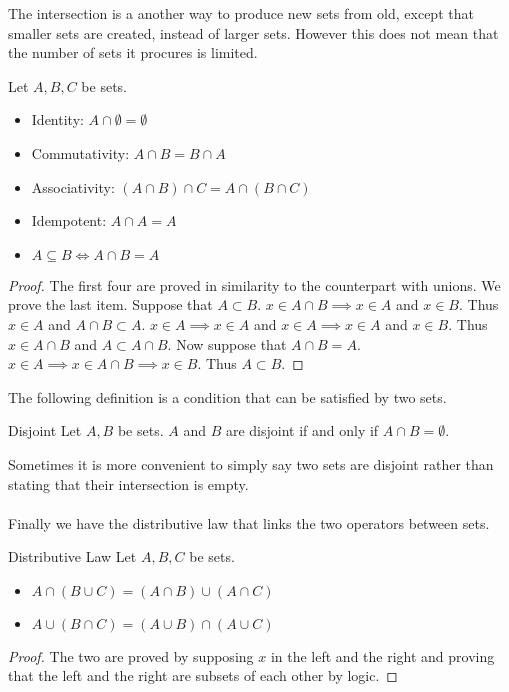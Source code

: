 The intersection is a another way to produce new sets from old, except that smaller sets are created, instead of larger sets. However this does not mean that the number of sets it procures is limited. 

\begin{prp}{}{} Let $A,B,C$ be sets. 
\begin{itemize}
\item Identity: $A\cap\emptyset=\emptyset$
\item Commutativity: $A\cap B=B\cap A$
\item Associativity: $(A\cap B)\cap C=A\cap(B\cap C)$
\item Idempotent: $A\cap A=A$
\item $A\subseteq B\iff A\cap B=A$
\end{itemize}\tcbline
\begin{proof} The first four are proved in similarity to the counterpart with unions. We prove the last item. Suppose that $A\subset B$. $x\in A\cap B\implies x\in A$ and $x\in B$. Thus $x\in A$ and $A\cap B\subset A$. $x\in A\implies x\in A$ and $x\in A\implies x\in A$ and $x\in B$. Thus $x\in A\cap B$ and $A\subset A\cap B$. Now suppose that $A\cap B=A$. $x\in A\implies x\in A\cap B\implies x\in B$. Thus $A\subset B$. 
\end{proof}
\end{prp}

The following definition is a condition that can be satisfied by two sets. 

\begin{defn}{Disjoint}{} Let $A,B$ be sets. $A$ and $B$ are disjoint if and only if $A\cap B=\emptyset$. 
\end{defn}

Sometimes it is more convenient to simply say two sets are disjoint rather than stating that their intersection is empty. \\~\\

Finally we have the distributive law that links the two operators between sets. 

\begin{thm}{Distributive Law}{} Let $A,B,C$ be sets. 
\begin{itemize}
\item $A\cap(B\cup C)=(A\cap B)\cup(A\cap C)$
\item $A\cup(B\cap C)=(A\cup B)\cap(A\cup C)$
\end{itemize}\tcbline
\begin{proof} The two are proved by supposing $x$ in the left and the right and proving that the left and the right are subsets of each other by logic. 
\end{proof}
\end{thm}

